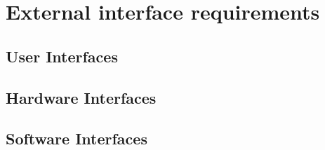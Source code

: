 \section{External interface requirements}

\subsection{User Interfaces}

\subsection{Hardware Interfaces}

\subsection{Software Interfaces}
